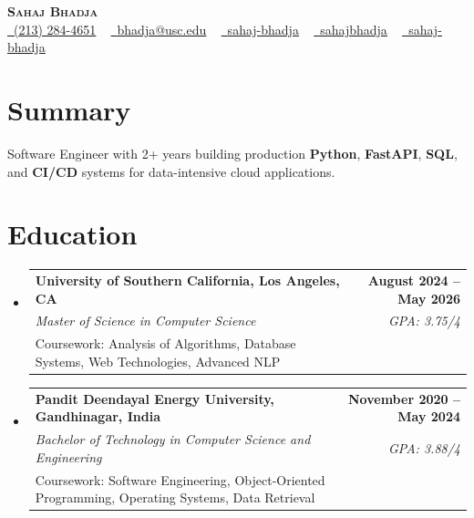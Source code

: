 \documentclass[letterpaper,10pt]{article}
\makeatletter
\newcommand{\sectionGap}{\vspace{-8pt}}
\newcommand{\resumeEduSubheading}[5]{\vspace{-1pt}\item\begin{tabular*}{1.0\textwidth}[t]{l@{\extracolsep{\fill}}r}\textbf{#1} & \textbf{\small #2} \\\textit{\small #3} & \textit{\small #4} \\\small #5 & \\\end{tabular*}\vspace{-4pt}}
\newcommand{\resumeSubHeadingListStart}{\begin{itemize}[leftmargin=0.0in, label={}]}
\newcommand{\resumeSubHeadingListEnd}{\end{itemize}}
\makeatother
\begin{document}
\begin{center}
{\Huge \scshape \textbf{Sahaj Bhadja}} \\ \vspace{1pt}
\small \href{tel:2132844651}{\faPhone\ \underline{(213) 284-4651}} ~ \href{mailto:bhadja@usc.edu}{\raisebox{-0.2\height}\faEnvelope\ \underline{bhadja@usc.edu}} ~
\href{https://www.linkedin.com/in/sahaj-bhadja/}{\raisebox{-0.2\height}\faLinkedin\ \underline{sahaj-bhadja}} ~ \href{https://github.com/SAHAJ-BHADJA}{\raisebox{-0.2\height}\faGithub\ \underline{sahajbhadja}} ~
\href{https://sahaj-bhadja.vercel.app/}{\raisebox{-0.2\height}\faGlobe\ \underline{sahaj-bhadja}}
\end{center}
\vspace{-16pt}
\section{Summary}
\begin{itemize}[leftmargin=0.15in, label={}]
\small{\item{Software Engineer with 2+ years building production \textbf{Python}, \textbf{FastAPI}, \textbf{SQL}, and \textbf{CI/CD} systems for data-intensive cloud applications.}}
\end{itemize}
\sectionGap
\section{Education}
\resumeSubHeadingListStart
\resumeEduSubheading{University of Southern California, Los Angeles, CA}{August 2024 -- May 2026}{Master of Science in Computer Science}{GPA: 3.75/4}{Coursework: Analysis of Algorithms, Database Systems, Web Technologies, Advanced NLP}
\resumeEduSubheading{Pandit Deendayal Energy University, Gandhinagar, India}{November 2020 -- May 2024}{Bachelor of Technology in Computer Science and Engineering}{GPA: 3.88/4}{Coursework: Software Engineering, Object-Oriented Programming, Operating Systems, Data Retrieval}
\resumeSubHeadingListEnd
\sectionGap
\end{document}
